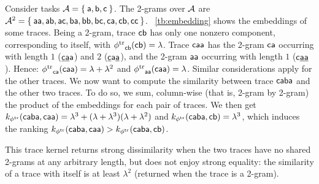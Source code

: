 \begin{example}\label{ex:wheredotiszero} %
	Consider tasks $\mathcal{A}=\Set{\mathsf{a},\mathsf{b},\mathsf{c}}$. The 2-grams over $\mathcal{A}$ are $\mathcal{A}^2=\Set{\mathsf{aa},\mathsf{ab},\mathsf{ac},\mathsf{ba},\mathsf{bb},\mathsf{bc},\mathsf{ca},\mathsf{cb},\mathsf{cc}}$. \tablename~\ref{tb:embedding} shows the embeddings of some traces. Being a 2-gram, trace $\mathsf{cb}$ has only one nonzero component, corresponding to itself, with ${\phi^{\text{tr}}}_{\mathsf{cb}}(\mathsf{cb})=\lambda$. Trace $\mathsf{caa}$ has the 2-gram $\mathsf{ca}$ occurring with length $1$ ($\mathsf{\underline{ca}a}$) and $2$ ($\mathsf{\underline{c}a\underline{a}}$), and the 2-gram $\mathsf{aa}$ occurring with length $1$ ($\mathsf{c\underline{aa}}$). Hence: ${\phi^{\text{tr}}}_{\mathsf{ca}}(\mathsf{caa})=\lambda+\lambda^2$ and  ${\phi^{\text{tr}}}_{\mathsf{aa}}(\mathsf{caa})=\lambda$.  Similar considerations apply for the other traces.
	We now want to compute the similarity between trace $\mathsf{caba}$ and the other two traces. To do so, we sum, column-wise (that is, 2-gram by 2-gram) the product of the embeddings for each pair of traces. We then get $k_{{\phi^{\text{tr}}}}(\mathsf{caba},\mathsf{caa})=\lambda^3+(\lambda+\lambda^3)(\lambda+\lambda^2)$ and $k_{{\phi^{\text{tr}}}}(\mathsf{caba},\mathsf{cb})=\lambda^3
	$,
	which induces the ranking $
	k_{{\phi^{\text{tr}}}}(\mathsf{caba},\mathsf{caa})>
	k_{{\phi^{\text{tr}}}}(\mathsf{caba},\mathsf{cb})
	$.
\end{example}


This trace kernel returns strong dissimilarity when the two traces have no shared 2-grams at any arbitrary length, but does not enjoy strong equality: the similarity of a trace with itself is at least $\lambda^2$ (returned when the trace is a 2-gram).


\endinput




